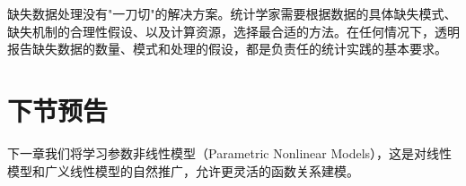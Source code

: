 缺失数据处理没有"一刀切"的解决方案。统计学家需要根据数据的具体缺失模式、缺失机制的合理性假设、以及计算资源，选择最合适的方法。在任何情况下，透明报告缺失数据的数量、模式和处理的假设，都是负责任的统计实践的基本要求。

\section{下节预告}

下一章我们将学习参数非线性模型（Parametric Nonlinear Models），这是对线性模型和广义线性模型的自然推广，允许更灵活的函数关系建模。

\endinput
